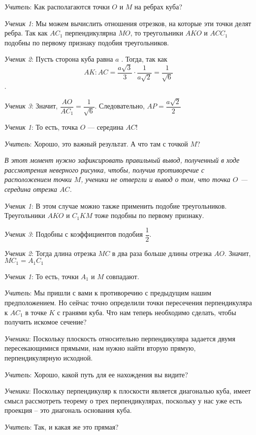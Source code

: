 \documentclass[a4paper,14pt,russian]{extreport}
\begin{document}
\textit{Учитель}: Как располагаются точки $O$ и $M$ на ребрах куба?

\textit{Ученик 1}: Мы можем вычислить отношения отрезков, на которые эти точки делят ребра. Так как $AC_1$ перпендикулярна $MO$, то треугольники $AKO$ и $ACC_1$ подобны по первому признаку подобия треугольников.

\textit{Ученик 2}: Пусть сторона куба равна $a$ . Тогда, так как $$AK:AC=\frac{a\sqrt{3}}{3} \cdot \frac{1}{a\sqrt{2}}=\frac{1}{\sqrt{6}}$$.

\textit{Ученик 3}: 
Значит, $\dfrac{AO}{AC_1}=\dfrac{1}{\sqrt{6}}$. Следовательно, $AP=\dfrac{a\sqrt{2}}{2}$ 

\textit{Ученик 1}: То есть, точка $O$ — середина $AC$!

\textit{Учитель}: Хорошо, это важный результат. А что там с точкой $M$?

\textit{В этот момент нужно зафиксировать правильный вывод, полученный в ходе рассмотрения неверного рисунка, чтобы, получив противоречие с расположением точки $M$, ученики не отвергли и вывод о том, что точка $O$ — середина отрезка $AC$.}

\textit{Ученик 1}: В этом случае можно также применить подобие треугольников. Треугольники $AKO$ и $C_1KM$ тоже подобны по первому признаку.

\textit{Ученик 3}: Подобны с коэффициентов подобия $\dfrac{1}{2}$.

\textit{Ученик 2}: Тогда длина отрезка $MC$ в два раза больше длины отрезка $AO$. Значит, $MC_1=A_1C_1$

\textit{Ученик 1}: То есть, точки $A_1$ и $M$ совпадают.

\textit{Учитель}: Мы пришли с вами к противоречию с предыдущим нашим предположением. Но сейчас точно определили точки пересечения перпендикуляра к $AC_1$ в точке $K$ с гранями куба. Что нам теперь необходимо сделать, чтобы получить искомое сечение?

\textit{Ученики}: Поскольку плоскость относительно перпендикуляра задается двумя пересекающимися прямыми, нам нужно найти вторую прямую, перпендикулярную исходной.

\textit{Учитель}: Хорошо, какой путь для ее нахождения вы видите?

\textit{Ученики}: Поскольку перпендикуляр к плоскости является диагональю куба, имеет смысл рассмотреть теорему о трех перпендикулярах, поскольку у нас уже есть проекция – это диагональ основания куба.

\textit{Учитель}: Так, и какая же это прямая?
\end{document}
